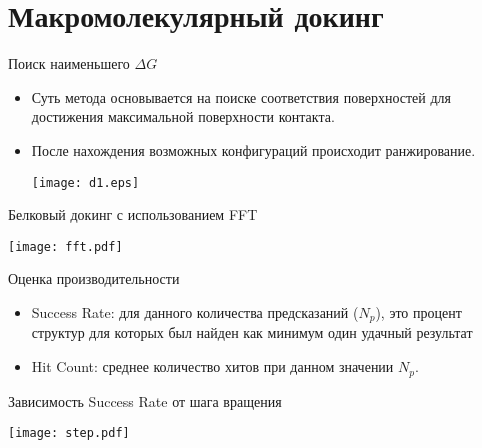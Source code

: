 \section{Макромолекулярный докинг}
\begin{frame}{Поиск наименьшего $\Delta G$}

    \begin{itemize}
        \item   Суть метода основывается на поиске соответствия поверхностей для достижения максимальной поверхности контакта.
        \item После нахождения возможных конфигураций происходит ранжирование.
            \begin{center}
          \texttt{[image: d1.eps]}

            \end{center}
        \end{itemize}
  \end{frame}

  \begin{frame}{Белковый докинг с использованием FFT}
            \begin{center}
          \texttt{[image: fft.pdf]}

            \end{center}
  \end{frame}

  \begin{frame}{Оценка производительности}
      \begin{itemize}
          \item Success Rate: для данного количества предсказаний ($N_p$), это процент структур для которых был найден
              как минимум один удачный результат
          \item Hit Count: среднее количество хитов при данном значении $N_p$.
      \end{itemize}
  \end{frame}


  \begin{frame}{Зависимость Success Rate от шага вращения}
            \begin{center}
          \texttt{[image: step.pdf]}

            \end{center}
  \end{frame}


